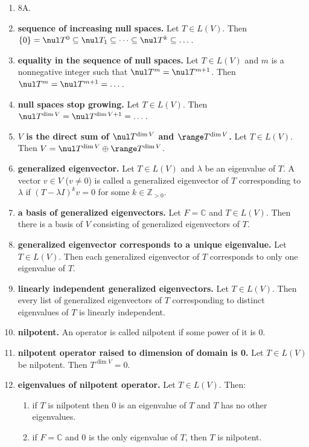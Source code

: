 \begin{enumerate}
	\item 8A. 
	\item \textbf{sequence of increasing null spaces. } Let $T \in L(V)$. Then $\{0\} = \nul T^0 \subseteq \nul T_1 \subseteq \dots \subseteq \nul T^k \subseteq \dots$. 
	\item \textbf{equality in the sequence of null spaces. } Let $T \in L(V)$ and $m$ is a nonnegative integer such that $\nul T^m = \nul T^{m+1}$. Then $\nul T^m = \nul T^{m+1} = \dots $. 
	\item \textbf{null spaces stop growing. } Let $T \in L(V)$. Then $\nul T^{\dim V} = \nul T^{\dim V +1} = \dots$. 
	\item \textbf{$V$ is the direct sum of $\nul T^{\dim V}$ and $\range T^{\dim V}$. } Let $T \in L(V)$. Then $V = \nul T^{\dim V} \oplus \range T^{\dim V}$. 
	\item \textbf{generalized eigenvector. } Let $T \in L(V)$ and $\lambda$ be an eigenvalue of $T$. A vector $v \in V$ ($v \neq 0$) is called a generalized eigenvector of $T$ corresponding to $\lambda$ if $(T - \lambda I)^k v = 0$ for some $k \in \mathbb{Z}_{>0}$. 
	\item \textbf{a basis of generalized eigenvectors. } Let $F = \mathbb{C}$ and $T \in L(V)$. Then there is a basis of $V$ consisting of generalized eigenvectors of $T$. 
	\item \textbf{generalized eigenvector corresponds to a unique eigenvalue. } Let $T \in L(V)$. Then each generalized eigenvector of $T$ corresponds to only one eigenvalue of $T$. 
	\item \textbf{linearly independent generalized eigenvectors. } Let $T \in L(V)$. Then every list of generalized eigenvectors of $T$ corresponding to distinct eigenvalues of $T$ is linearly independent. 
	\item \textbf{nilpotent. } An operator is called nilpotent if some power of it is 0. 
	\item \textbf{nilpotent operator raised to dimension of domain is 0. } Let $T \in L(V)$ be nilpotent. Then $T^{\dim V} = 0$. 
	\item \textbf{eigenvalues of nilpotent operator. } Let $T \in L(V)$. Then: 
	\begin{enumerate}
		\item if $T$ is nilpotent then 0 is an eigenvalue of $T$ and $T$ has no other eigenvalues. 
		\item if $F = \mathbb{C}$ and 0 is the only eigenvalue of $T$, then $T$ is nilpotent. 
	\end{enumerate}

\end{enumerate}
